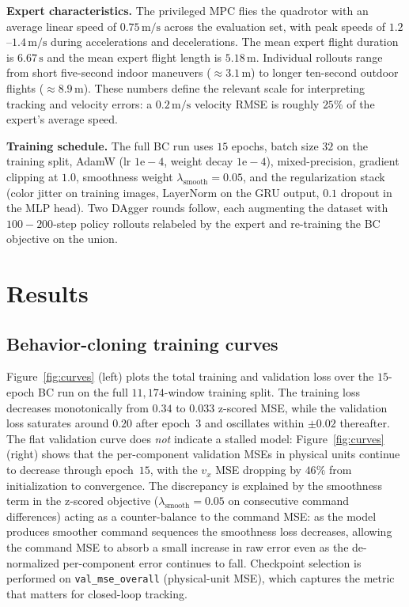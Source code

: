 \documentclass[10pt,twocolumn,letterpaper]{article}
\begin{document}
\textbf{Expert characteristics.} The privileged MPC flies the quadrotor with an average linear speed of $0.75\,\mathrm{m/s}$ across the evaluation set, with peak speeds of $1.2$--$1.4\,\mathrm{m/s}$ during accelerations and decelerations. The mean expert flight duration is $6.67\,\mathrm{s}$ and the mean expert flight length is $5.18\,\mathrm{m}$. Individual rollouts range from short five-second indoor maneuvers ($\approx 3.1\,\mathrm{m}$) to longer ten-second outdoor flights ($\approx 8.9\,\mathrm{m}$). These numbers define the relevant scale for interpreting tracking and velocity errors: a $0.2\,\mathrm{m/s}$ velocity RMSE is roughly $25\%$ of the expert's average speed.

\textbf{Training schedule.} The full BC run uses $15$ epochs, batch size $32$ on the training split, AdamW (lr $1\mathrm{e}{-}4$, weight decay $1\mathrm{e}{-}4$), mixed-precision, gradient clipping at $1.0$, smoothness weight $\lambda_\text{smooth}{=}0.05$, and the regularization stack (color jitter on training images, LayerNorm on the GRU output, $0.1$ dropout in the MLP head). Two DAgger rounds follow, each augmenting the dataset with $100{-}200$-step policy rollouts relabeled by the expert and re-training the BC objective on the union.

\section{Results}
\label{sec:results}

\subsection{Behavior-cloning training curves}

Figure~\ref{fig:curves} (left) plots the total training and validation loss over the $15$-epoch BC run on the full $11{,}174$-window training split. The training loss decreases monotonically from $0.34$ to $0.033$ z-scored MSE, while the validation loss saturates around $0.20$ after epoch~$3$ and oscillates within $\pm 0.02$ thereafter. The flat validation curve does \emph{not} indicate a stalled model: Figure~\ref{fig:curves} (right) shows that the per-component validation MSEs in physical units continue to decrease through epoch~$15$, with the $v_x$ MSE dropping by $46\%$ from initialization to convergence. The discrepancy is explained by the smoothness term in the z-scored objective ($\lambda_\text{smooth}{=}0.05$ on consecutive command differences) acting as a counter-balance to the command MSE: as the model produces smoother command sequences the smoothness loss decreases, allowing the command MSE to absorb a small increase in raw error even as the de-normalized per-component error continues to fall. Checkpoint selection is performed on \texttt{val\_mse\_overall} (physical-unit MSE), which captures the metric that matters for closed-loop tracking.
\end{document}
